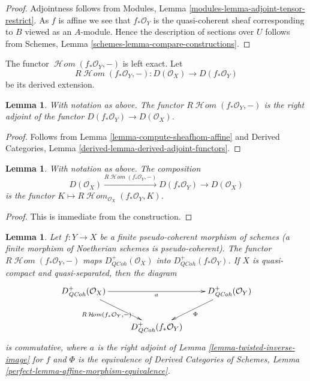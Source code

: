 \documentclass{stacks-project}
\theoremstyle{plain}
\newtheorem{lemma}[subsection]{Lemma}
\theoremstyle{definition}
\theoremstyle{remark}
\numberwithin{equation}{subsection}
\def\SheafHom{\mathop{\mathcal{H}\!\mathit{om}}\nolimits}
\def\QCoh{\mathit{QCoh}}
\begin{document}
\begin{proof}
Adjointness follows from
Modules, Lemma \ref{modules-lemma-adjoint-tensor-restrict}.
As $f$ is affine we see that $f_*\mathcal{O}_Y$ is
the quasi-coherent sheaf corresponding to $B$ viewed
as an $A$-module. Hence the description of sections over $U$ follows from
Schemes, Lemma \ref{schemes-lemma-compare-constructions}.
\end{proof}

\noindent
The functor $\SheafHom(f_*\mathcal{O}_Y, -)$ is left exact. Let
$$
R\SheafHom(f_*\mathcal{O}_Y, -) :
D(\mathcal{O}_X)
\longrightarrow
D(f_*\mathcal{O}_Y)
$$
be its derived extension.

\begin{lemma}
\label{lemma-sheafhom-affine-adjoint}
With notation as above. The functor $R\SheafHom(f_*\mathcal{O}_Y, -)$
is the right adjoint of the functor $D(f_*\mathcal{O}_Y) \to D(\mathcal{O}_X)$.
\end{lemma}

\begin{proof}
Follows from Lemma \ref{lemma-compute-sheafhom-affine}
and
Derived Categories, Lemma \ref{derived-lemma-derived-adjoint-functors}.
\end{proof}

\begin{lemma}
\label{lemma-sheafhom-affine-ext}
With notation as above. The composition
$$
D(\mathcal{O}_X) \xrightarrow{R\SheafHom(f_*\mathcal{O}_Y, -)}
D(f_*\mathcal{O}_Y) \to D(\mathcal{O}_X)
$$
is the functor $K \mapsto R\SheafHom_{\mathcal{O}_X}(f_*\mathcal{O}_Y, K)$.
\end{lemma}

\begin{proof}
This is immediate from the construction.
\end{proof}

\begin{lemma}
\label{lemma-finite-twisted}
Let $f : Y \to X$ be a finite pseudo-coherent morphism of schemes
(a finite morphism of Noetherian schemes is pseudo-coherent).
The functor $R\SheafHom(f_*\mathcal{O}_Y, -)$ maps
$D_\QCoh^+(\mathcal{O}_X)$ into $D_\QCoh^+(f_*\mathcal{O}_Y)$.
If $X$ is quasi-compact and quasi-separated, then the diagram
$$
\xymatrix{
D_\QCoh^+(\mathcal{O}_X) \ar[rr]_a \ar[rd]_{R\SheafHom(f_*\mathcal{O}_Y, -)}
& & D_\QCoh^+(\mathcal{O}_Y) \ar[ld]^\Phi \\
& D_\QCoh^+(f_*\mathcal{O}_Y)
}
$$
is commutative, where $a$ is the right adjoint of
Lemma \ref{lemma-twisted-inverse-image} for $f$ and $\Phi$ is the equivalence
of Derived Categories of Schemes, Lemma
\ref{perfect-lemma-affine-morphism-equivalence}.
\end{lemma}
\end{document}
